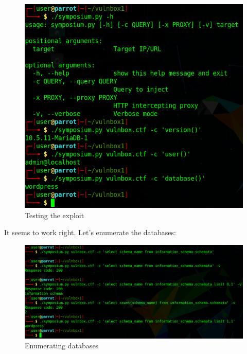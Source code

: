 \documentclass[12pt]{article}
\begin{document}
    \begin{figure}[H]\label{pic:25-exploit-basic-info}
        \centering
        \includegraphics[width=1.00\textwidth]{25-exploit-basic-info.png}
        \caption{Testing the exploit}
    \end{figure}

    It seems to work right. Let's enumerate the databases:

    \begin{figure}[H]\label{pic:26-exploit-databases}
        \centering
        \includegraphics[width=1.00\textwidth]{26-exploit-databases.png}
        \caption{Enumerating databases}
    \end{figure}
\end{document}
